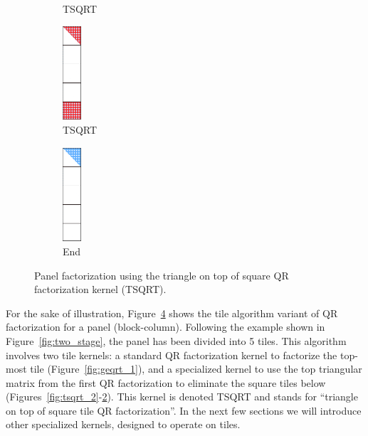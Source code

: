 \begin{figure}[h!]
\begin{subfigure}[t]{0.160 \textwidth}
      \caption{\label{fig:tsqrt_4}TSQRT}
    \end{subfigure}
    \hfill
    \begin{subfigure}[t]{0.160 \textwidth}
      \includegraphics[width=0.7cm, height=3.5cm]{fig/SVD_rect_panel_7}
      \caption{\label{fig:tsqrt_5}TSQRT}
    \end{subfigure}
    \hfill
    \begin{subfigure}[t]{0.160 \textwidth}
      \includegraphics[width=0.7cm, height=3.5cm]{fig/SVD_rect_panel_8}
      \caption{\label{fig:tsqrt_output}End}
    \end{subfigure}
    \caption{Panel factorization using the triangle on top of square QR factorization kernel (TSQRT).
    \label{fig:rect_panel}}
\end{figure}

For the sake of illustration, Figure~\ref{fig:rect_panel}
shows the tile algorithm variant of QR factorization for a panel
(block-column).
Following the example shown in Figure~\ref{fig:two_stage},
the panel has been divided into 5 tiles.
This algorithm involves two tile kernels:
a standard QR factorization kernel to
factorize the top-most tile (Figure~\ref{fig:geqrt_1}),
and a specialized kernel to use the top triangular matrix
from the first QR factorization
to eliminate the square tiles below
(Figures~\ref{fig:tsqrt_2}-\ref{fig:tsqrt_5}).
This kernel is denoted TSQRT and stands
for ``triangle on top of square tile QR factorization''.
In the next few sections we will introduce other specialized kernels,
designed to operate on tiles.
